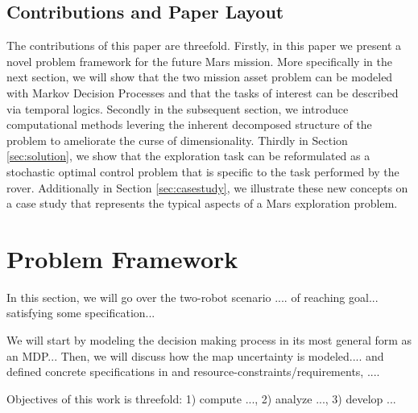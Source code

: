 \documentclass[conference]{IEEEtran}
\newcommand{\sofieNew}[1]{{\color{blue}#1}}
\begin{document}
\subsection{Contributions and Paper Layout}
\sofieNew{The contributions of this paper are threefold. Firstly, in this paper we present a novel problem framework for the future Mars mission.  More specifically in the next section, we will show that the two mission asset problem can be modeled with Markov Decision Processes and that the tasks of interest can be described via temporal logics. 
Secondly in the subsequent section, we introduce computational methods levering the inherent decomposed structure of the problem to ameliorate the curse of dimensionality. 
Thirdly in Section \ref{sec:solution}, we show that the exploration task can be reformulated as a stochastic optimal control problem that is specific to 
the task performed by the rover.  
Additionally in Section \ref{sec:casestudy}, we illustrate these new concepts on a case study that represents the typical aspects of a Mars exploration problem.}


\section{Problem Framework}
\label{sec:problem}
{\color{orange}
In this section, we will go over the two-robot scenario .... of reaching goal... satisfying some specification...

We will start by modeling the decision making process in its most general form as an MDP... Then, we will discuss how the map uncertainty is modeled.... and defined concrete specifications in and resource-constraints/requirements, ....

Objectives of this work is threefold: 1) compute ..., 2) analyze ..., 3) develop ...
}
\end{document}
